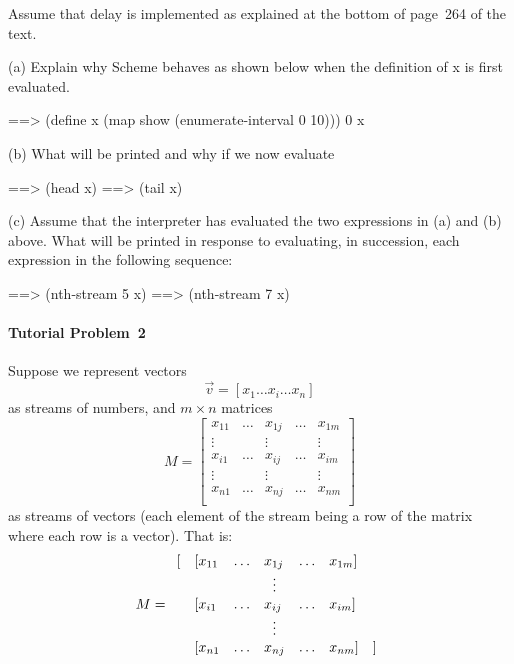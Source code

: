 Assume that delay is implemented as explained at the bottom of page~264 of the
text.

(a) Explain why {\sc Scheme} behaves as shown below when the definition
of {\cf x} is first evaluated.

\beginlisp 
==> (define x (map show (enumerate-interval 0 10)))
0
x
\endlisp 

{\samepage
(b) What will be printed and why if we now evaluate

\nopagebreak[4]
\beginlisp 
==> (head x)
\null
==> (tail x)
\endlisp 
}

(c) Assume that the interpreter has evaluated the two expressions in (a)
and (b) above. What will be printed in response to evaluating, in succession,
each expression in the following sequence:

\beginlisp 
==> (nth-stream 5 x)
\null
==> (nth-stream 7 x)
\endlisp 

\paragraph{Tutorial Problem~2} 

Suppose we represent vectors
\[ \vec{v} = [x_1\ldots x_i\ldots x_n] \] as streams of
numbers, and $m \times n$ matrices
\[ M = \left[ \begin{array}{lclcl}
                x_{11} & \ldots & x_{1j} & \ldots & x_{1m} \\
                \vdots &        & \vdots &        & \vdots \\
                x_{i1} & \ldots & x_{ij} & \ldots & x_{im} \\
                \vdots &        & \vdots &        & \vdots \\
                x_{n1} & \ldots & x_{nj} & \ldots & x_{nm} \\
              \end{array}
      \right]
\]
as streams of vectors (each element of the
stream being a row of the matrix where each row is a vector). That is:
\[ M = \begin{array}{rlclcll}
        [ & [x_{11} & \ldots & x_{1j} & \ldots & x_{1m}] &     \\
          &         &        & \multicolumn{1}{c}{\vdots} & & & \\
          & [x_{i1} & \ldots & x_{ij} & \ldots & x_{im}] &     \\
          &         &        & \multicolumn{1}{c}{\vdots} & & & \\
          & [x_{n1} & \ldots & x_{nj} & \ldots & x_{nm}] & ]   \\
       \end{array}
\]

